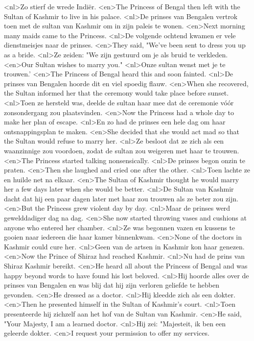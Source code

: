 <nl>Zo stierf de wrede Indi\"er.
<en>The Princess of Bengal then left with the Sultan of Kashmir to live in his palace.
<nl>De prinses van Bengalen vertrok toen met de sultan van Kashmir om in zijn paleis te wonen.
<en>Next morning many maids came to the Princess.
<nl>De volgende ochtend kwamen er vele dienstmeisjes naar de prinses.
<en>They said, "We've been sent to dress you up as a bride.
<nl>Ze zeiden: "We zijn gestuurd om je als bruid te verkleden.
<en>Our Sultan wishes to marry you."
<nl>Onze sultan wenst met je te trouwen.'
<en>The Princess of Bengal heard this and soon fainted.
<nl>De prinses van Bengalen hoorde dit en viel spoedig flauw.
<en>When she recovered, the Sultan informed her that the ceremony would take place before sunset.
<nl>Toen ze hersteld was, deelde de sultan haar mee dat de ceremonie vóór zonsondergang zou plaatsvinden.
<en>Now the Princess had a whole day to make her plan of escape.
<nl>En zo had de prinses een hele dag om haar ontsnappingsplan te maken.
<en>She decided that she would act mad so that the Sultan would refuse to marry her.
<nl>Ze besloot dat ze zich als een waanzinnige zou voordoen, zodat de sultan zou weigeren met haar te trouwen.
<en>The Princess started talking nonsensically.
<nl>De prinses begon onzin te praten.
<en>Then she laughed and cried one after the other.
<nl>Toen lachte ze en huilde  net na elkaar.
<en>The Sultan of Kashmir thought he would marry her a few days later when she would be better.
<nl>De Sultan van Kashmir dacht dat hij een paar dagen later met haar zou trouwen als ze beter zou zijn.
<en>But the Princess grew violent day by day.
<nl>Maar de prinses werd  gewelddadiger dag na dag.
<en>She now started throwing vases and cushions at anyone who entered her chamber.
<nl>Ze was begonnen vazen en kussens te gooien naar iedereen die haar kamer binnenkwam.
<en>None of the doctors in Kashmir could cure her.
<nl>Geen van de artsen in Kashmir kon haar genezen.
<en>Now the Prince of Shiraz had reached Kashmir.
<nl>Nu had de prins van Shiraz Kashmir bereikt.
<en>He heard all about the Princess of Bengal and was happy beyond words to have found his lost beloved.
<nl>Hij hoorde alles over de prinses van Bengalen en was blij dat hij zijn verloren geliefde te hebben gevonden.
<en>He dressed as a doctor.
<nl>Hij kleedde zich als een dokter.
<en>Then he presented himself in the Sultan of Kashmir's court.
<nl>Toen presenteerde hij zichzelf aan het hof van de Sultan van Kashmir.
<en>He said, "Your Majesty, I am a learned doctor.
<nl>Hij zei: "Majesteit, ik ben een geleerde dokter.
<en>I request your permission to offer my services.
